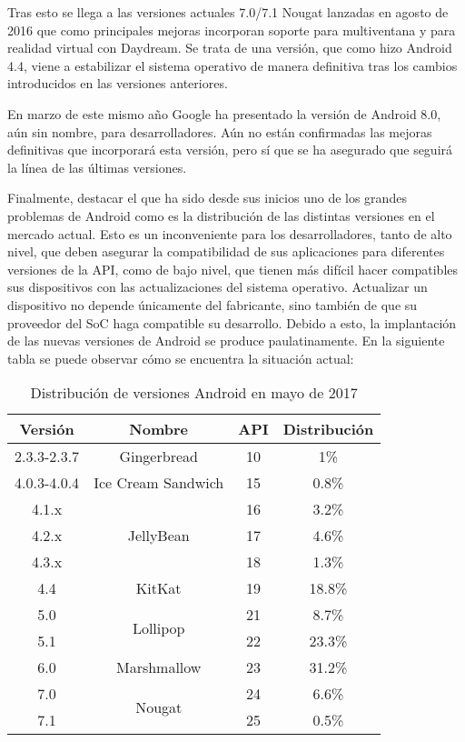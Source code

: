 Tras esto se llega a las versiones actuales 7.0/7.1 Nougat lanzadas en agosto de 2016 que como principales mejoras incorporan soporte para multiventana y para realidad virtual con Daydream. Se trata de una versión, que como hizo Android 4.4, viene a estabilizar el sistema operativo de manera definitiva tras los cambios introducidos en las versiones anteriores.

En marzo de este mismo año Google ha presentado la versión de Android 8.0, aún sin nombre, para desarrolladores. Aún no están confirmadas las mejoras definitivas que incorporará esta versión, pero sí que se ha asegurado que seguirá la línea de las últimas versiones.

Finalmente, destacar el que ha sido desde sus inicios uno de los grandes problemas de Android como es la distribución de las distintas versiones en el mercado actual. Esto es un inconveniente para los desarrolladores, tanto de alto nivel, que deben asegurar la compatibilidad de sus aplicaciones para diferentes versiones de la \gls{API}, como de bajo nivel, que tienen más difícil hacer compatibles sus dispositivos con las actualizaciones del sistema operativo. Actualizar un dispositivo no depende únicamente del fabricante, sino también de que su proveedor del \gls{SoC} haga compatible su desarrollo. Debido a esto, la implantación de las nuevas versiones de Android se produce paulatinamente. En la siguiente tabla se puede observar cómo se encuentra la situación actual:

\begin{table}[htb]
	\centering
	\begin{tabular}{|c|c|c|c|}
		\hline
		\textbf{Versión} & \textbf{Nombre} & \textbf{\gls{API}} & \textbf{Distribución} \\
		\hline \hline
		2.3.3-2.3.7 & Gingerbread & 10 & 1\% \\ \hline
		4.0.3-4.0.4 & Ice Cream Sandwich & 15 & 0.8\% \\ \hline
		4.1.x & \multirow{3}{1cm}{JellyBean} & 16 & 3.2\% \\ \cline{1-1} \cline{3-4}
		4.2.x & & 17 & 4.6\% \\ \cline{1-1} \cline{3-4}
		4.3.x & & 18 & 1.3\% \\ \hline
		4.4 & KitKat & 19 & 18.8\% \\ \hline
		5.0 & \multirow{2}{1cm}{Lollipop} & 21 & 8.7\% \\ \cline{1-1} \cline{3-4}
		5.1 & & 22 & 23.3\% \\ \hline
		6.0 & Marshmallow & 23 & 31.2\% \\ \hline
		7.0 & \multirow{2}{1cm}{Nougat} & 24 & 6.6\% \\ \cline{1-1} \cline{3-4}
		7.1 & & 25 & 0.5\% \\ \hline
	\end{tabular}
	\caption{Distribución de versiones Android en mayo de 2017}
	\label{tabla:distribucion-versiones}
\end{table}


